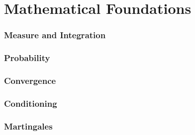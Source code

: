 \documentclass[12pt, a4paper]{article}
\begin{document}

\clearpage
\pagestyle{empty}
\tableofcontents
\clearpage
\pagestyle{fancy}

\part{Mathematical Foundations}

\section{Measure and Integration}
%

\section{Probability}


\section{Convergence}


\section{Conditioning}


\section{Martingales}

\end{document}
